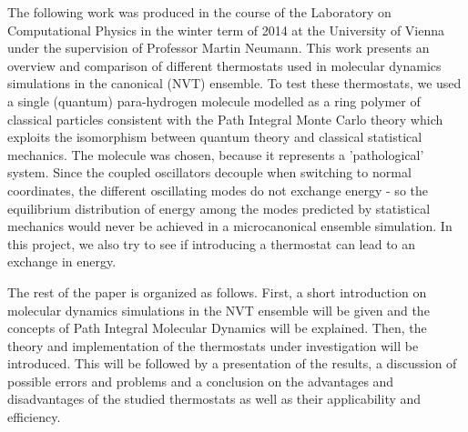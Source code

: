 The following work was produced in the course of the Laboratory on Computational Physics in the winter term of 2014 at the University of Vienna under the supervision of Professor Martin Neumann. This work presents an overview and comparison of different thermostats used in molecular dynamics simulations in the canonical (NVT) ensemble. To test these thermostats, we used a single (quantum) para-hydrogen molecule modelled as a ring polymer of classical particles consistent with the Path Integral Monte Carlo theory which exploits the isomorphism between quantum theory and classical statistical mechanics. The molecule was chosen, because it represents a 'pathological' system. Since the coupled oscillators decouple when switching to normal coordinates, the different oscillating modes do not exchange energy - so the equilibrium distribution of energy among the modes predicted by statistical mechanics would never be achieved in a microcanonical ensemble simulation. In this project, we also try to see if introducing a thermostat can lead to an exchange in energy.    

The rest of the paper is organized as follows. First, a short introduction on molecular dynamics simulations in the NVT ensemble will be given and the concepts of Path Integral Molecular Dynamics will be explained. Then, the theory and implementation of the thermostats under investigation will be introduced. This will be followed by a presentation of the results, a discussion of possible errors and problems and a conclusion on the advantages and disadvantages of the studied thermostats as well as their applicability and efficiency. 
